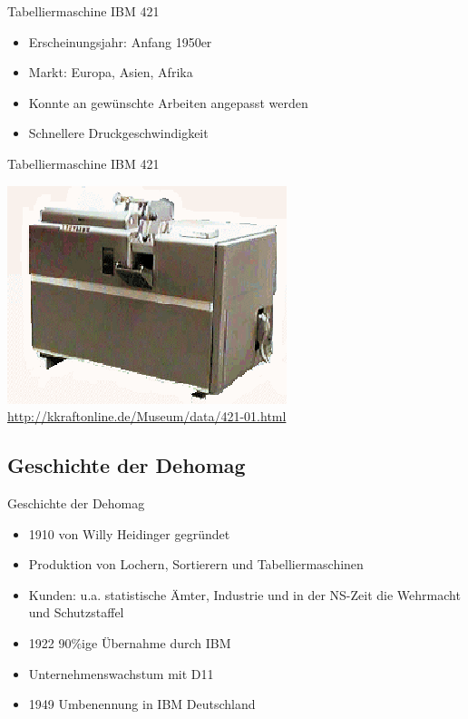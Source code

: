 \documentclass[EU2]{beamer}
\begin{document}
\begin{frame}{Tabelliermaschine IBM 421}
    \begin{itemize}
      \item Erscheinungsjahr: Anfang 1950er
      \item Markt: Europa, Asien, Afrika
      \item Konnte an gewünschte Arbeiten angepasst werden
      \item Schnellere Druckgeschwindigkeit
    \end{itemize}
\end{frame}

\begin{frame}{Tabelliermaschine IBM 421}
\begin{center}
    \includegraphics[height=0.9\textheight]{IBM 421}\\
    \tiny{\url{http://kkraftonline.de/Museum/data/421-01.html}}
  \end{center}
\end{frame}

\subsection{Geschichte der Dehomag}
\begin{frame}{Geschichte der Dehomag}
    \begin{itemize}
      \item 1910 von Willy Heidinger gegründet
      \item Produktion von Lochern, Sortierern und Tabelliermaschinen
      \item Kunden: u.a. statistische Ämter, Industrie und in der NS-Zeit die Wehrmacht und Schutzstaffel
      \item 1922 90\%ige Übernahme durch IBM
      \item Unternehmenswachstum mit D11
      \item 1949 Umbenennung in IBM Deutschland
    \end{itemize}
\end{frame}
\end{document}
